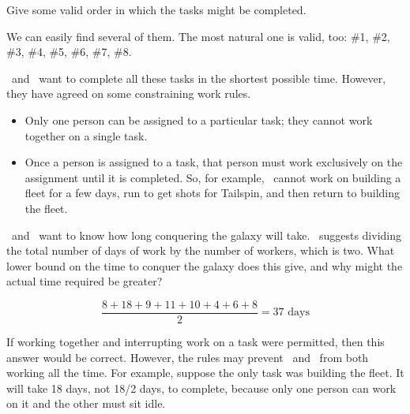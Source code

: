 \begin{problem}
\bparts

\ppart Give some valid order in which the tasks might be completed.

\begin{solution}
We can easily find several of them. The most natural one is valid, too:
\#1, \#2, \#3, \#4, \#5, \#6, \#7, \#8.

\end{solution}
\eparts

\Jay\  and \Rongrong\  want to complete all these tasks in the
shortest possible time. However, they have agreed on some constraining
work rules.
\begin{itemize}

\item Only one person can be assigned to a particular task; they cannot
work together on a single task.

\item Once a person is assigned to a task, that person must work
exclusively on the assignment until it is completed.  So, for example,
\Jay\  cannot work on building a fleet for a few days, run to get shots
for Tailspin, and then return to building the fleet.

\end{itemize}


\bparts

\ppart \Jay\  and \Rongrong\  want to know how long conquering the
galaxy will take.  \Rongrong\  suggests dividing the total number of days of
work by the number of workers, which is two.  What lower bound on the time
to conquer the galaxy does this give, and why might the actual time
required be greater?

\begin{solution}
\begin{equation*}
\frac{8 + 18 + 9 + 11 + 10 + 4 + 6 + 8}{2} = 37 \text{ days}
\end{equation*}

If working together and interrupting work on a task were permitted, then
this answer would be correct.  However, the rules may prevent \Jay\  and
\Rongrong\  from both working all the time.  For example, suppose the only task
was building the fleet.  It will take 18 days, not 18/2 days, to complete,
because only one person can work on it and the other must sit idle.
\end{solution}


\end{problem}

